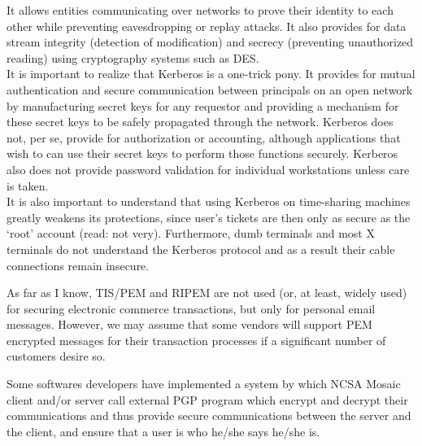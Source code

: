 \begin{htmllist}

    
    It allows entities communicating over networks to prove their identity
    to each other while preventing eavesdropping or replay attacks. It also
    provides for data stream integrity (detection of modification) and
    secrecy (preventing unauthorized reading) using cryptography systems
    such as DES.\\
    
    It is important to realize that Kerberos is a one-trick pony. It
    provides for mutual authentication and secure communication between
    principals on an open network by manufacturing secret keys for any
    requestor and providing a mechanism for these secret keys to be safely
    propagated through the network. Kerberos does not, per se, provide for
    authorization or accounting, although applications that wish to can use
    their secret keys to perform those functions securely. Kerberos also
    does not provide password validation for individual workstations unless
    care is taken.\\
    
    It is also important to understand that using Kerberos on time-sharing
    machines greatly weakens its protections, since user's tickets are then
    only as secure as the `root' account (read: not very). Furthermore,
    dumb terminals and most X terminals do not understand the Kerberos
    protocol and as a result their cable connections remain insecure.


    
    As far as I know, TIS/PEM and RIPEM are not used (or, at least, widely
    used) for securing electronic commerce transactions, but only for
    personal email messages. However, we may assume that some vendors will
    support PEM encrypted messages for their transaction processes if a
    significant number of customers desire so.


    
    Some softwares developers have implemented a system by which NCSA
    Mosaic client and/or server call external PGP program which encrypt and
    decrypt their communications and thus provide secure communications
    between the server and the client, and ensure that a user is who he/she
    says he/she is.\\
    

\end{htmllist}
